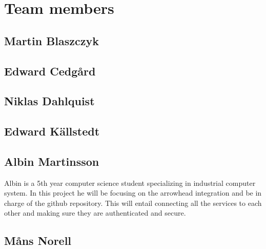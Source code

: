 \section{Team members}

\subsection{Martin Blaszczyk}

\subsection{Edward Cedgård}

\subsection{Niklas Dahlquist}

\subsection{Edward Källstedt}

\subsection{Albin Martinsson}
Albin is a 5th year computer science student specializing in industrial computer system. In this project he will be focusing on the 
arrowhead integration and be in charge of the github repository. This will entail connecting all the services to each other and
making sure they are authenticated and secure. 

\subsection{Måns Norell}










